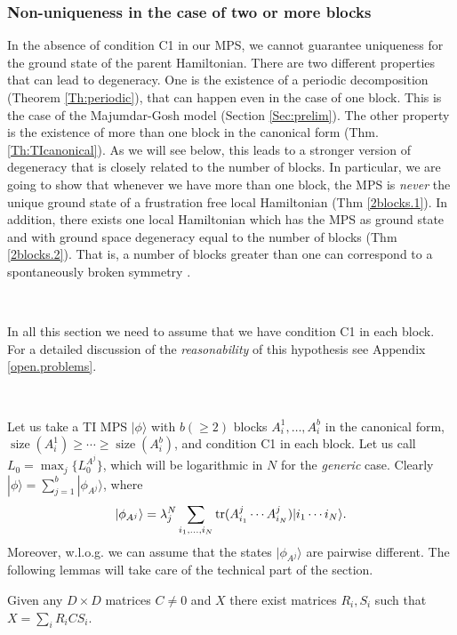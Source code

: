 \documentclass[aps,prl,epsfig,graphics,floatfix,mathbbm,a4paper]{article}
\newcommand{\1}{\mathbbm{1}}
\renewcommand{\>}{\rangle}
\newcommand{\<}{\langle}
\DeclareMathOperator{\size}{size}
\begin{document}
\subsubsection{Non-uniqueness in the case of two or more blocks}

In the absence of condition C1 in our MPS, we cannot guarantee
uniqueness for the ground state of the parent Hamiltonian. There
are two different properties that can lead to degeneracy. One is
the existence of a periodic decomposition (Theorem
\ref{Th:periodic}), that can happen even in the case of one block.
This is the case of the Majumdar-Gosh model (Section
\ref{Sec:prelim}). The other property is the existence of more
than one block in the canonical form (Thm.\ref{Th:TIcanonical}).
As we will see below, this leads to a stronger version of
degeneracy that is closely related to the number of blocks. In
particular, we are going to show that whenever we have more than
one block, the MPS is \textit{never} the unique ground state of a
frustration free local Hamiltonian (Thm \ref{2blocks.1}). In
addition, there exists one local Hamiltonian which has the MPS as
ground state and with ground space degeneracy equal to the number
of blocks (Thm \ref{2blocks.2}). That is, a number of blocks
greater than one can correspond to a spontaneously broken symmetry
\cite{NachtergaeleSym}.

\

In all this section we need to assume that we have condition C1 in
each block. For a detailed discussion of the
\textit{reasonability} of this hypothesis see Appendix
\ref{open.problems}.

\

Let us take a TI MPS $|\phi\>$ with $b (\ge 2)$ blocks
$A^1_i,\ldots, A_i^b$ in the canonical form, $\size(A^1_i)\ge
    \cdots\ge \size(A^b_i)$, and condition C1 in each block. Let us
call $L_0=\max_j\{L_0^{A^j}\}$, which will be logarithmic in $N$
for the \textit{generic} case. Clearly
$|\phi\>=\sum_{j=1}^b|\phi_{A^j}\>$, where
$$|\phi_{A^j}\>=\lambda_j^N\sum_{i_1,\ldots,i_N}
    \trace(A^j_{i_1}\cdots A^j_{i_N})|i_1\cdots i_N\rangle.$$
Moreover, w.l.o.g. we can assume that the states $|\phi_{A^j}\>$
are pairwise different. The following lemmas will take care of the
technical part of the section.

\begin{lemma}\label{lem1}
    Given any $D\times D$ matrices $C\not =0$ and $X$ there exist
    matrices $R_i, S_i$ such that $X=\sum_i R_iCS_i$.
\end{lemma}
\end{document}
